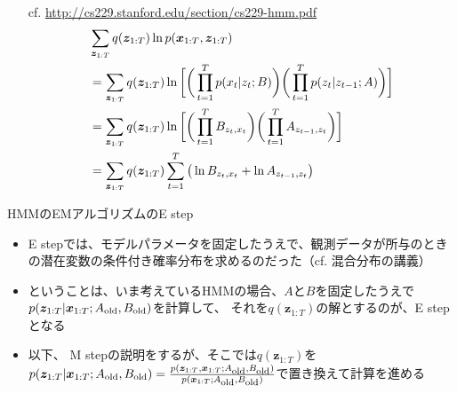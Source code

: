 \documentclass[aspectratio=169,unicode,dvipdfmx,14pt]{beamer}
\begin{document}
\begin{frame}
\FontMath
\begin{itemize}
\item[cf.] \href{http://cs229.stanford.edu/section/cs229-hmm.pdf}{http://cs229.stanford.edu/section/cs229-hmm.pdf}
\begin{align}
& \sum_{\bm{z}_{1:T}} q(\bm{z}_{1:T}) \ln p(\bm{x}_{1:T}, \bm{z}_{1:T})
\notag \\ &
= \sum_{\bm{z}_{1:T}} q(\bm{z}_{1:T}) \ln \bigg[
\bigg( \prod_{t=1}^T p(x_t|z_t;B) \bigg) \bigg( \prod_{t=1}^T p(z_t|z_{t-1};A) \bigg)\bigg]
\notag \\ &
= \sum_{\bm{z}_{1:T}} q(\bm{z}_{1:T}) \ln \bigg[
\bigg( \prod_{t=1}^T B_{z_t,x_t} \bigg)
\bigg( \prod_{t=1}^T A_{z_{t-1},z_t} \bigg)
\bigg]
\notag \\ &
= \sum_{\bm{z}_{1:T}} q(\bm{z}_{1:T})
\sum_{t=1}^T \big( \ln B_{z_t,x_t} + \ln A_{z_{t-1},z_t} \big)
\end{align}
\end{itemize}
\end{frame}

\begin{frame}{HMMのEMアルゴリズムのE step}
\begin{itemize}
\item E stepでは、モデルパラメータを固定したうえで、観測データが所与のときの潜在変数の条件付き確率分布を求めるのだった（cf. 混合分布の講義）
\item ということは、いま考えているHMMの場合、$A$と$B$を固定したうえで$p(\bm{z}_{1:T} | \bm{x}_{1:T}; A_{\mbox{\scriptsize old}}, B_{\mbox{\scriptsize old}})$を計算して、
それを$q(\bm{z}_{1:T})$の解とするのが、E stepとなる
\item 以下、 M stepの説明をするが、そこでは$q(\bm{z}_{1:T})$を$p(\bm{z}_{1:T} | \bm{x}_{1:T}; A_{\mbox{\scriptsize old}}, B_{\mbox{\scriptsize old}})=\frac{p(\bm{z}_{1:T} , \bm{x}_{1:T}; A_{\mbox{\scriptsize old}}, B_{\mbox{\scriptsize old}})}{p(\bm{x}_{1:T}; A_{\mbox{\scriptsize old}}, B_{\mbox{\scriptsize old}})}$で置き換えて計算を進める
\end{itemize}
\end{frame}
\end{document}
